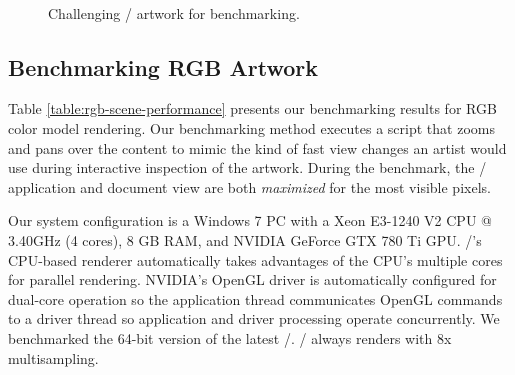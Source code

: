 \begin{figure}
 \\
\caption{Challenging \Illustrator/ artwork for benchmarking.}
\label{fig:scenes}
\end{figure}


\subsection{Benchmarking RGB Artwork}

Table \ref{table:rgb-scene-performance} presents our benchmarking results
for RGB color model rendering.
Our benchmarking method executes a script that zooms and pans over
the content to mimic the kind of fast view changes an artist would use
during interactive inspection of the artwork.  During the benchmark,
the \Illustrator/ application and document view are both {\em maximized}
for the most visible pixels.


Our system configuration is a Windows 7 PC with a Xeon E3-1240 V2
CPU @ 3.40GHz (4 cores), 8 GB RAM, and NVIDIA GeForce GTX 780 Ti GPU.
\AGM/'s CPU-based renderer automatically takes advantages of the CPU's
multiple cores for parallel rendering.  NVIDIA's OpenGL driver is
automatically configured for dual-core operation so the application
thread communicates OpenGL commands to a driver thread so application
and driver processing operate concurrently.  We benchmarked the 64-bit
version of the latest \Illustrator/.
\Illustrator/ always renders with 8x multisampling.


